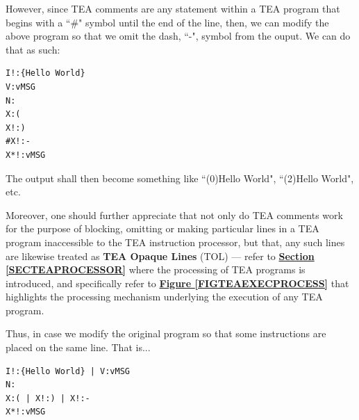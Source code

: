 \documentclass[a4paper, 18pt]{book} %
\begin{document}
{{{\begin{appendices}
\vspace{2em}

However, since TEA comments are any statement within a TEA program that begins with a ``\#" symbol until the end of the line, then, we can modify the above program so that we omit the dash, ``-", symbol from the ouput. We can do that as such:


\vspace{2em}

  \begin{tcolorbox}[teaterminalstyle, title=TEA COMMENTS: Example 2: Program without comments, breakable]
  \begin{lstlisting}[language=TEA,breaklines=true,]
I!:{Hello World}
V:vMSG
N:
X:(
X!:)
#X!:-
X*!:vMSG
   \end{lstlisting}
  \end{tcolorbox}

\vspace{2em}


The output shall then become something like ``(0)Hello World", ``(2)Hello World", etc.

\vspace{2em}

Moreover, one should further appreciate that not only do TEA comments work for the purpose of blocking, omitting or making particular lines in a TEA program inaccessible to the TEA instruction processor, but that, any such lines are likewise treated as \textbf{TEA Opaque Lines} (TOL) --- refer to \textbf{\hyperref[SECTEAPROCESSOR]{Section \ref{SECTEAPROCESSOR}}} where the processing of TEA programs is introduced, and specifically refer to \textbf{\hyperref[FIGTEAEXECPROCESS]{Figure \ref{FIGTEAEXECPROCESS}}} that highlights the processing mechanism underlying the execution of any TEA program.

\vspace{2em}

Thus, in case we modify the original program so that some instructions are placed on the same line. That is...


\vspace{2em}

  \begin{tcolorbox}[teaterminalstyle, title=TEA COMMENTS: Example 3: Program without comments, breakable]
  \begin{lstlisting}[language=TEA,breaklines=true,]
I!:{Hello World} | V:vMSG
N:
X:( | X!:) | X!:-
X*!:vMSG
   \end{lstlisting}
  \end{tcolorbox}


\end{appendices}}}}
\end{document}

